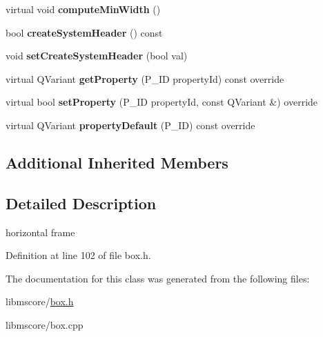\begin{DoxyCompactItemize}
virtual void {\bfseries compute\+Min\+Width} ()
\item 
\mbox{\label{class_ms_1_1_h_box_a9091799d03634df89deee5cf8e700729}} 
bool {\bfseries create\+System\+Header} () const
\item 
\mbox{\label{class_ms_1_1_h_box_a17ec25d1853fca14de1b1dfa9e80b12e}} 
void {\bfseries set\+Create\+System\+Header} (bool val)
\item 
\mbox{\label{class_ms_1_1_h_box_a12dc69839f6a456fb09ab3d65e2189c6}} 
virtual Q\+Variant {\bfseries get\+Property} (P\+\_\+\+ID property\+Id) const override
\item 
\mbox{\label{class_ms_1_1_h_box_a4b7c2c666540d6a39ad0ccda20eccce9}} 
virtual bool {\bfseries set\+Property} (P\+\_\+\+ID property\+Id, const Q\+Variant \&) override
\item 
\mbox{\label{class_ms_1_1_h_box_a4b8915b2b350558ce333191b78890737}} 
virtual Q\+Variant {\bfseries property\+Default} (P\+\_\+\+ID) const override
\end{DoxyCompactItemize}
\subsection*{Additional Inherited Members}


\subsection{Detailed Description}
horizontal frame 

Definition at line 102 of file box.\+h.



The documentation for this class was generated from the following files\+:\begin{DoxyCompactItemize}
\item 
libmscore/\hyperlink{box_8h}{box.\+h}\item 
libmscore/box.\+cpp\end{DoxyCompactItemize}
